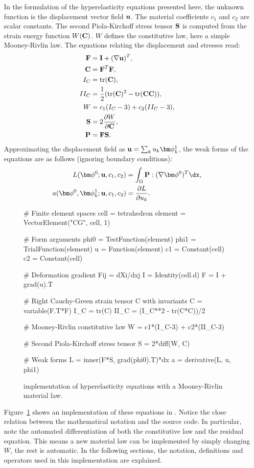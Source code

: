 In the formulation of the hyperelasticity equations presented here,
the unknown function is the displacement vector field $\mathbf{u}$.  The
material coefficients $c_1$ and $c_2$ are scalar constants.  The
second Piola-Kirchoff stress tensor $\mathbf{S}$ is computed from the strain
energy function $W(\mathbf{C})$. $W$ defines the constitutive law, here a
simple Mooney-Rivlin law. The equations relating the displacement and
stresses read:
\begin{align}
\begin{split}
\mathbf{F}   &=  \mathbf{I} + (\nabla \mathbf{u})^T, \\
\mathbf{C}   &=  \mathbf{F}^T\mathbf{F}, \\
I_C   &=  \operatorname{tr}(\mathbf{C}), \\
II_C  &=  \frac 1 2 (\operatorname{tr}(\mathbf{C})^2 - \operatorname{tr}(\mathbf{C}\mathbf{C})), \\
W     &=  c_1(I_C - 3) + c_2(II_C - 3), \\
\mathbf{S}   &=  2\frac{\partial W}{\partial\mathbf{C}}, \\
\mathbf{P}   &=  \mathbf{F}\mathbf{S}.
\end{split}
\end{align}
Approximating the displacement field as $\uu = \sum_k u_k \bphi^1_k$,
the weak forms of the equations are as follows (ignoring boundary conditions):
\begin{align}
L(\bphi^0; \uu, c_1, c_2) &= \int_\Omega \PP : (\nabla\bphi^0)^T \dx, \\
a(\bphi^0, \bphi^1_k; \uu, c_1, c_2) &= \frac{\partial L}{\partial u_k}.
\end{align}
\begin{figure}\label{ufl:fig:hypcode}
\begin{code}
# Finite element spaces
cell = tetrahedron
element = VectorElement("CG", cell, 1)

# Form arguments
phi0 = TestFunction(element)
phi1 = TrialFunction(element)
u = Function(element)
c1 = Constant(cell)
c2 = Constant(cell)

# Deformation gradient Fij = dXi/dxj
I = Identity(cell.d)
F = I + grad(u).T

# Right Cauchy-Green strain tensor C with invariants
C = variable(F.T*F)
I_C = tr(C)
II_C = (I_C**2 - tr(C*C))/2

# Mooney-Rivlin constitutive law
W = c1*(I_C-3) + c2*(II_C-3)

# Second Piola-Kirchoff stress tensor
S = 2*diff(W, C)

# Weak forms
L = inner(F*S, grad(phi0).T)*dx
a = derivative(L, u, phi1)
\end{code}
\caption{\ufl{} implementation of hyperelasticity equations with a Mooney-Rivlin material law.}
\end{figure}
Figure~\ref{ufl:fig:hypcode} shows an implementation of these
equations in \ufl{}.  Notice the close relation between the
mathematical notation and the \ufl{} source code. In particular, note
the automated differentiation of both the constitutive law and the
residual equation. This means a new material law can be implemented by
simply changing $W$, the rest is automatic.  In the following
sections, the notation, definitions and operators used in this
implementation are explained.

